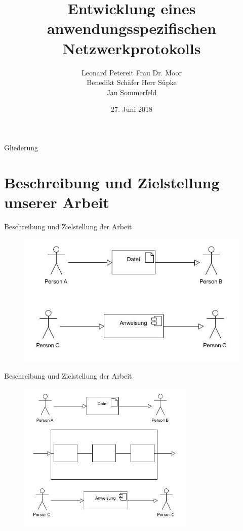\documentclass{beamer}
\title[]{Entwicklung eines anwendungsspezifischen Netzwerkprotokolls}
\author{Leonard Petereit\hfill \hspace{0.5cm} Frau Dr. Moor\\ Benedikt Schäfer\hfill \hspace{1cm} Herr Süpke \\ Jan Sommerfeld \hspace{4.25cm} }
\institute{Albert-Schweitzer Gymnasium Erfurt - Spezialschulteil}
\date{27. Juni 2018}
\begin{document}
\begin{frame}
	
  \titlepage
\end{frame}

\begin{frame}{Gliederung}

  \tableofcontents
\end{frame}



\section{Beschreibung und Zielstellung unserer Arbeit}

\begin{frame}{Beschreibung und Zielstellung der Arbeit}
\begin{figure}
\includegraphics[width=\textwidth]{s1.jpg}

\end{figure}
\end{frame}

\begin{frame}{Beschreibung und Zielstellung der Arbeit}
\begin{figure}
\includegraphics[width=8.5cm]{s2-c.jpg}
\end{figure}
\end{frame}
\end{document}
